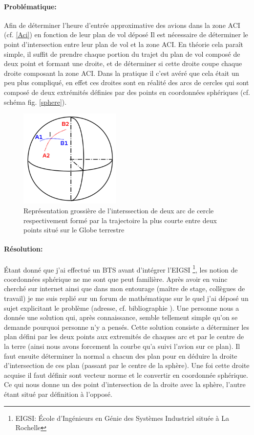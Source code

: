             \paragraph{Problématique:}
Afin de déterminer l'heure d'entrée approximative des avions dans la zone ACI (cf. \vref{Aci}) en fonction de leur plan de vol déposé Il est nécessaire de déterminer le point d'intersection entre leur plan de vol et la zone ACI. En théorie cela paraît simple, il suffit de prendre chaque portion du trajet du plan de vol composé de deux point et formant une droite, et  de déterminer si cette droite coupe chaque droite composant la zone ACI. Dans la pratique il c'est avéré que cela était un peu plus compliqué, en effet ces droites sont en réalité des arcs de cercles qui sont composé de deux extrémités définies par des points en coordonnées sphériques (cf. schéma fig. \vref{sphere}).
\begin{figure}
    \center
    \includegraphics[width=5cm]{images/Sphere.png}
    \caption{Représentation grossière de l'interssection de deux arc de cercle respectivement formé par la trajectoire la plus courte entre deux points situé sur le Globe terrestre}
    \label{sphere}
\end{figure}
            \paragraph{Résolution:}
Étant donné que j'ai effectué un BTS avant d'intégrer l'EIGSI \footnote{EIGSI: École d'Ingénieurs en Génie des Systèmes Industriel située à La Rochelle}, les notion de coordonnées sphérique ne me sont que peut familière. Après avoir en vainc cherché sur internet ainsi que dans mon entourage  (maître de stage, collègues de travail) je me suis replié sur un forum de mathématique sur le quel j'ai déposé un sujet explicitant le problème (adresse, cf. bibliographie \cite{forummath}). Une personne nous a donnée une solution qui, après connaissance, semble tellement simple qu'on se demande pourquoi personne n'y a pensés. Cette solution consiste a déterminer les plan défini par les deux points aux extremités de chaques arc et par le centre de la terre (ainsi nous avons forcement la courbe qu'a suivi l'avion sur ce plan). Il faut ensuite déterminer la normal a chacun des plan pour en déduire la droite d'intersection de ces plan (passant par le centre de la sphère). Une foi cette droite acquise il faut définir sont vecteur norme et le convertir en coordonnée sphérique. Ce qui nous donne un des point d'intersection de la droite avec la sphère, l'autre étant situé par définition à l'opposé.


